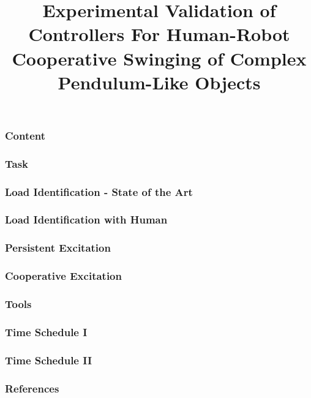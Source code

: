 \documentclass[student,noshadow]{ITRslides}
\title{Experimental Validation of Controllers For Human-Robot Cooperative Swinging of Complex Pendulum-Like Objects}
\begin{document}
\begin{frame}
    \titlepage
\end{frame}

\begin{frame}
	\frametitle{Content}
\end{frame}

\begin{frame}
	\frametitle{Task}
\end{frame}

\begin{frame}
	\frametitle{Load Identification - State of the Art}
\end{frame}

\begin{frame}
	\frametitle{Load Identification with Human}
\end{frame}

\begin{frame}
	\frametitle{Persistent Excitation}
\end{frame}

\begin{frame}
	\frametitle{Cooperative Excitation}
\end{frame}

\begin{frame}
	\frametitle{Tools}
\end{frame}

\begin{frame}
	\frametitle{Time Schedule I}
\end{frame}

\begin{frame}
	\frametitle{Time Schedule II}
\end{frame}

\appendix
\begin{frame}
	\frametitle{References}
	\printbibliography
\end{frame}
\end{document}
